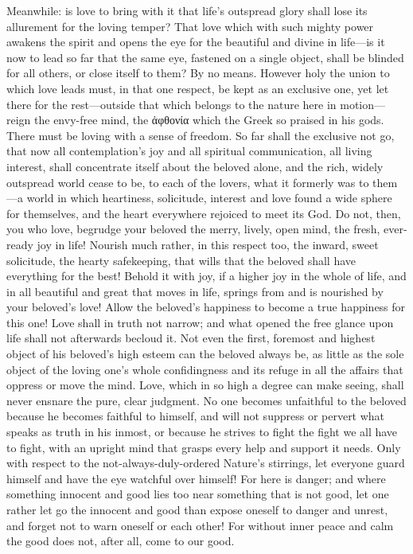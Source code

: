 \documentclass[12pt,a4paper]{book}
\begin{document}
Meanwhile: is love to bring with it that life's outspread glory shall lose
its allurement for the loving temper? That love which with such mighty
power awakens the spirit and opens the eye for the beautiful and divine in
life---is it now to lead so far that the same eye, fastened on a single
object, shall be blinded for all others, or close itself to them? By no
means. However holy the union to which love leads must, in that one
respect, be kept as an exclusive one, yet let there for the rest---outside
that which belongs to the nature here in motion---reign the envy-free mind,
the ἀφθονία which the Greek so praised in his gods. There must be loving
with a sense of freedom. So far shall the exclusive not go, that now all
contemplation's joy and all spiritual communication, all living interest,
shall concentrate itself about the beloved alone, and the rich, widely
outspread world cease to be, to each of the lovers, what it formerly was to
them---a world in which heartiness, solicitude, interest and love found a
wide sphere for themselves, and the heart everywhere rejoiced to meet its
God. Do not, then, you who love, begrudge your beloved the merry, lively,
open mind, the fresh, ever-ready joy in life! Nourish much rather, in this
respect too, the inward, sweet solicitude, the hearty safekeeping, that
wills that the beloved shall have everything for the best! Behold it with
joy, if a higher joy in the whole of life, and in all beautiful and great
that moves in life, springs from and is nourished by your beloved's love!
Allow the beloved's happiness to become a true happiness for this one! Love
shall in truth not narrow; and what opened the free glance upon life shall
not afterwards becloud it. Not even the first, foremost and highest object
of his beloved's high esteem can the beloved always be, as little as the
sole object of the loving one's whole confidingness and its refuge in all
the affairs that oppress or move the mind. Love, which in so high a degree
can make seeing, shall never ensnare the pure, clear judgment. No one
becomes unfaithful to the beloved because he becomes faithful to himself,
and will not suppress or pervert what speaks as truth in his inmost, or
because he strives to fight the fight we all have to fight, with an upright
mind that grasps every help and support it needs. Only with respect to the
not-always-duly-ordered Nature's stirrings, let everyone guard himself and
have the eye watchful over himself! For here is danger; and where something
innocent and good lies too near something that is not good, let one rather
let go the innocent and good than expose oneself to danger and unrest, and
forget not to warn oneself or each other! For without inner peace and calm
the good does not, after all, come to our good.
\end{document}
